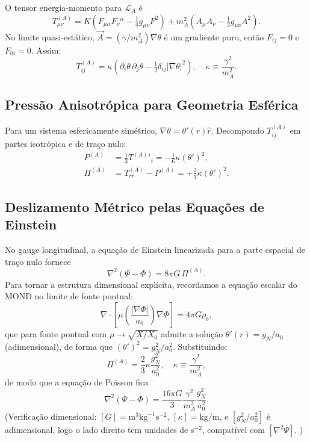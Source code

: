 \documentclass[aps,prd,twocolumn,showpacs,superscriptaddress]{revtex4-2}
\newcommand{\Lbar}{\mathcal{L}}
\newcommand{\aO}{a_0}
\begin{document}
O tensor energia-momento para $\Lbar_A$ é
\begin{equation}
  T^{(A)}_{\mu\nu} = K\!\left(F_{\mu\alpha}F_\nu{}^\alpha
    - \tfrac{1}{4}g_{\mu\nu}F^2\right)
    + m_A^2\!\left(A_\mu A_\nu - \tfrac{1}{2}g_{\mu\nu}A^2\right).
\end{equation}
No limite quasi-estático, $\vec{A} = (\gamma/m_A^2)\nabla\theta$
é um gradiente puro, então $F_{ij} = 0$ e $F_{0i} = 0$.
Assim:
\begin{equation}
  T^{(A)}_{ij} = \kappa\!\left(
    \partial_i\theta\,\partial_j\theta
    - \tfrac{1}{2}\delta_{ij}|\nabla\theta|^2
  \right),
  \quad \kappa \equiv \frac{\gamma^2}{m_A^2}.
  \label{eq:TAij}
\end{equation}

\subsection{Pressão Anisotrópica para Geometria Esférica}

Para um sistema esfericamente simétrico,
$\nabla\theta = \theta'(r)\hat r$.
Decompondo $T^{(A)}_{ij}$ em partes isotrópica e de traço nulo:
\begin{align}
  P^{(A)} &= \tfrac{1}{3}T^{(A)}{}^i{}_i = -\tfrac{1}{6}\kappa(\theta')^2, \\
  \Pi^{(A)} &= T^{(A)}_{rr} - P^{(A)}
             = +\tfrac{2}{3}\kappa(\theta')^2.
  \label{eq:Pi}
\end{align}

\subsection{Deslizamento Métrico pelas Equações de Einstein}

No gauge longitudinal, a equação de Einstein linearizada para a
parte espacial de traço nulo fornece
\begin{equation}
  \nabla^2(\Psi-\Phi) = 8\pi G\,\Pi^{(A)}.
\end{equation}
Para tornar a estrutura dimensional explícita, recordamos a
equação escalar do MOND no limite de fonte pontual:
\begin{equation}
  \nabla\cdot\!\left[\mu\!\left(\frac{|\nabla\Phi|}{\aO}\right)\nabla\Phi\right]
  = 4\pi G\rho_b,
\end{equation}
que para fonte pontual com $\mu \to \sqrt{X/X_0}$ admite a solução
$\theta'(r) = g_N/a_0$ (adimensional), de forma que
$(\theta')^2 = g_N^2/a_0^2$. Substituindo:
\begin{equation}
  \Pi^{(A)} = \frac{2}{3}\kappa\frac{g_N^2}{a_0^2}, \quad
  \kappa \equiv \frac{\gamma^2}{m_A^2},
\end{equation}
de modo que a equação de Poisson fica
\begin{equation}
  \nabla^2(\Psi-\Phi) = \frac{16\pi G}{3}\frac{\gamma^2}{m_A^2}
  \frac{g_N^2}{a_0^2}.
\end{equation}
(Verificação dimensional: $[G] = \text{m}^3\text{kg}^{-1}\text{s}^{-2}$,
$[\kappa] = \text{kg/m}$, e $[g_N^2/a_0^2]$ é adimensional, logo
o lado direito tem unidades de s$^{-2}$, compatível com $[\nabla^2\Psi]$. \checkmark)
\end{document}
